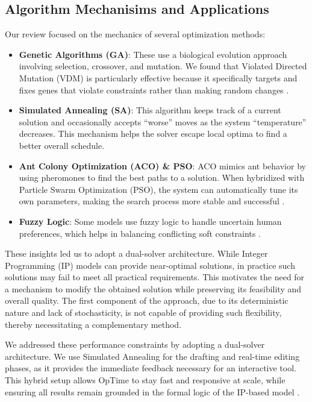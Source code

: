 \documentclass[11pt,a4paper]{article}
\begin{document}
\subsection{Algorithm Mechanisims and Applications}
Our review focused on the mechanics of several optimization methods:
\begin{itemize}
    \item \textbf{Genetic Algorithms (GA)}: These use a biological evolution approach involving selection, crossover, and mutation. We found that Violated Directed Mutation (VDM) is particularly effective because it specifically targets and fixes genes that violate constraints rather than making random changes \cite{Kristiadi2019}.
    \item \textbf{Simulated Annealing (SA)}: This algorithm keeps track of a current solution and occasionally accepts ``worse'' moves as the system ``temperature'' decreases. This mechanism helps the solver escape local optima to find a better overall schedule. \cite{jakoby2026discrete}
    \item \textbf{Ant Colony Optimization (ACO) \& PSO}: ACO mimics ant behavior by using pheromones to find the best paths to a solution. When hybridized with Particle Swarm Optimization (PSO), the system can automatically tune its own parameters, making the search process more stable and successful \cite{Yunita2018}.
    \item \textbf{Fuzzy Logic}: Some models use fuzzy logic to handle uncertain human preferences, which helps in balancing conflicting soft constraints \cite{robinson2025adaptive}.
\end{itemize}

These insights led us to adopt a dual-solver architecture. While Integer Programming (IP) models can provide near-optimal solutions, in practice such solutions may fail to meet all practical requirements. This motivates the need for a mechanism to modify the obtained solution while preserving its feasibility and overall quality. The first component of the approach, due to its deterministic nature and lack of stochasticity, is not capable of providing such flexibility, thereby necessitating a complementary method.

We addressed these performance constraints by adopting a dual-solver architecture. We use Simulated Annealing for the drafting and real-time editing phases, as it provides the immediate feedback necessary for an interactive tool. This hybrid setup allows OpTime to stay fast and responsive at scale, while ensuring all results remain grounded in the formal logic of the IP-based model \cite{strichman2017near}.
\end{document}
